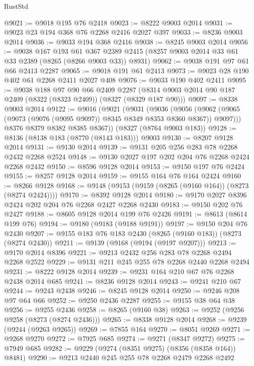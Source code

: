 \begin{lexlean}{RustStd}
\begin{coremodule}
@9021 := @9018 @195 @76 @2418
@9023 := @8222 @9003 @2014
@9031 := @9023 @23 @194 @368 @76 @2268 @2416 @2027 @397
@9033 := @8236 @9003 @2014
@9036 := @9033 @194 @368 @2416
@9038 := @8245 @9003 @2014
@9056 := @9038
    @167
    @193
    @61
    @367
    @2389
    @2415
    (@8257 @9003 @2014 @33 @61 @33 @2389 (@8265 (@8266 @9003 @33)) @8931)
@9062 := @9038 @191 @97 @61 @66 @2413 @2287
@9065 := @9018 @191 @61 @2413
@9073 := @9023 @28 @190 @402 @61 @2268 @2411 @2027 @408
@9076 := @9033 @190 @402 @2411
@9095 := @9038
    @188
    @97
    @90
    @66
    @2409
    @2287
    (@8314 @9003 @2014 @90 @187 @2409 (@8322 (@8323 @2409)) (@8327 (@8329 @187 @90)))
@9097 := @8338 @9003 @2014
@9122 := @9016
    (@9021
      (@9031
        (@9036
          (@9056 (@9062 (@9065 (@9073 (@9076 (@9095 @9097)) @8345 @8349 @8353 @8360 @8367)) @9097)))
        @8376
        @8379
        @8382
        @8385
        @8367))
    (@8327 (@8764 @9003 @183))
@9128 := @8136 (@8138 @183 (@8770 (@8143 @183))) @9003
@9130 := @8207 @9128 @2014
@9131 := @9130 @2014
@9139 := @9131 @205 @256 @283 @78 @2268 @2432 @2268 @2524
@9148 := @9130 @2027 @197 @202 @204 @76 @2268 @2424 @2268 @2432
@9150 := @8596 @9128 @2014
@9153 := @9150 @197 @76 @2424
@9155 := @8257 @9128 @2014
@9159 := @9155 @164 @76 @164 @2424
@9160 := @8266 @9128
@9168 := @9148 (@9153 (@9159 (@8265 (@9160 @164)) (@8273 (@8274 @2424))))
@9170 := @8392 @9128 @2014
@9180 := @9170 @2027 @8396 @2424 @202 @204 @76 @2268 @2427 @2268 @2430
@9183 := @9150 @202 @76 @2427
@9188 := @8605 @9128 @2014 @199 @76 @2426
@9191 := @8613 (@8614 @199 @76)
@9194 := @9180 (@9183 (@9188 @9191))
@9197 := @9150 @204 @76 @2430
@9207 := @9155 @183 @76 @183 @2430 (@8265 (@9160 @183)) (@8273 (@8274 @2430))
@9211 := @9139 (@9168 (@9194 (@9197 @9207)))
@9213 := @9170 @2014 @8396
@9221 := @9213 @2432 @256 @283 @78 @2268 @2494 @2268 @2522
@9229 := @9131 @211 @245 @255 @78 @2268 @2440 @2268 @2494
@9231 := @8222 @9128 @2014
@9239 := @9231 @164 @210 @67 @76 @2268 @2438 @2014 @685
@9241 := @8236 @9128 @2014
@9243 := @9241 @210 @67
@9244 := @9243 @2438
@9246 := @8245 @9128 @2014
@9250 := @9246 @208 @97 @64 @66
@9252 := @9250 @2436 @2287
@9255 := @9155 @38 @64 @38
@9256 := @9255 @2436
@9258 := @8265 (@9160 @38)
@9263 := @9252 (@9256 @9258 (@8273 (@8274 @2436)))
@9265 := @8338 @9128 @2014
@9268 := @9239 (@9244 (@9263 @9265))
@9269 := @7855 @164
@9270 := @8051 @9269
@9271 := @9268 @9270
@9272 := @7925 @685
@9274 := @9271 (@8347 @9272)
@9275 := @7949 @685
@9282 := @9229 (@9274 (@8351 @9275) (@8356 (@8358 @164)) @8481)
@9290 := @9213 @2440 @245 @255 @78 @2268 @2479 @2268 @2492

\end{coremodule}
\end{lexlean}
